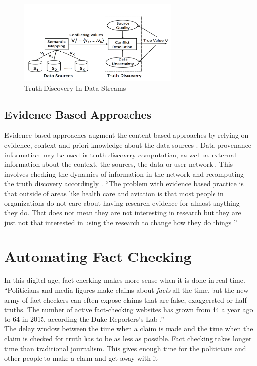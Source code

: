 \documentclass[sigconf]{acmart}
\begin{document}
\begin{figure}
\includegraphics[width=0.7\textwidth]{images/fig1.png}
\caption{Truth Discovery In Data Streams \cite{Zhao2014}}
\end{figure}

\subsection{Evidence Based Approaches}
Evidence based approaches augment the content based approaches by relying on evidence, context and priori knowledge about the data sources \cite{Berti-Equille2016}. Data provenance information may be used in truth discovery computation, as well as external information about the context, the sources, the data or user network \cite{Berti-Equille2016}. This involves checking the dynamics of information in the network and recomputing the truth discovery accordingly \cite{Berti-Equille2016}. 
``The problem with evidence based practice is that outside of areas like health care and aviation is that most people in organizations do not care about having research evidence for almost anything they do. That does not mean they are not interesting in research but they are just not that interested in using the research to change how they do things \cite{www-oxford}''

\section{Automating Fact Checking}
In this digital age, fact checking makes more sense when it is done in real time. ``Politicians and media figures make claims about \textit{facts} all the time, but the new army of fact-checkers can often expose claims that are false, exaggerated or half-truths. The number of active fact-checking websites has grown from 44 a year ago to 64 in 2015, according the Duke Reporters’s Lab \cite{Hassan2015}.'' \\
The delay window between the time when a claim is made and the time when the claim is checked for truth has to be as less as possible. Fact checking takes longer time than traditional journalism. This gives enough time for the politicians and other people to make a claim and get away with it \cite{Hassan2015}
\end{document}
